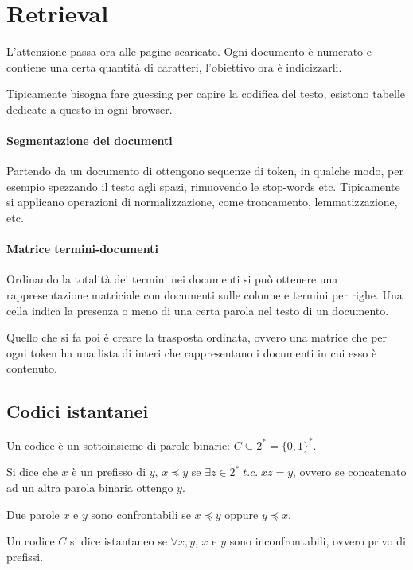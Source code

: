 \section{Retrieval}
L'attenzione passa ora alle pagine scaricate. 
Ogni documento è numerato e contiene una certa quantità di caratteri, l'obiettivo 
ora è indicizzarli.

\begin{remark}
    Tipicamente bisogna fare guessing per capire la codifica del testo, esistono 
    tabelle dedicate a questo in ogni browser.
\end{remark}

\paragraph{Segmentazione dei documenti}
Partendo da un documento di ottengono sequenze di token, in qualche modo, per esempio 
spezzando il testo agli spazi, rimuovendo le stop-words etc.
Tipicamente si applicano operazioni di normalizzazione, come troncamento, lemmatizzazione, etc.

\paragraph{Matrice termini-documenti}
Ordinando la totalità dei termini nei documenti si può ottenere una rappresentazione
matriciale con documenti sulle colonne e termini per righe. Una cella indica 
la presenza o meno di una certa parola nel testo di un documento.

Quello che si fa poi è creare la trasposta ordinata, ovvero una matrice che 
per ogni token ha una lista di interi che rappresentano i documenti in cui esso 
è contenuto.

\subsection{Codici istantanei}

Un codice è un sottoinsieme di parole binarie: $C \subseteq 2^* = \{0,1\}^*$.

\begin{definition}
    Si dice che $x$ è un prefisso di $y$, $x \preceq y$ se $\exists z \in 2^*\;t.c.\;xz = y$, ovvero se concatenato ad un altra parola binaria ottengo $y$.    
\end{definition}

\begin{definition}
    Due parole $x$ e $y$ sono confrontabili se $x \preceq y$ oppure $y \preceq x$.
\end{definition}

\begin{definition}
    Un codice $C$ si dice istantaneo se $\forall x,y$, $x$ e $y$ sono inconfrontabili, ovvero privo di prefissi.
\end{definition}